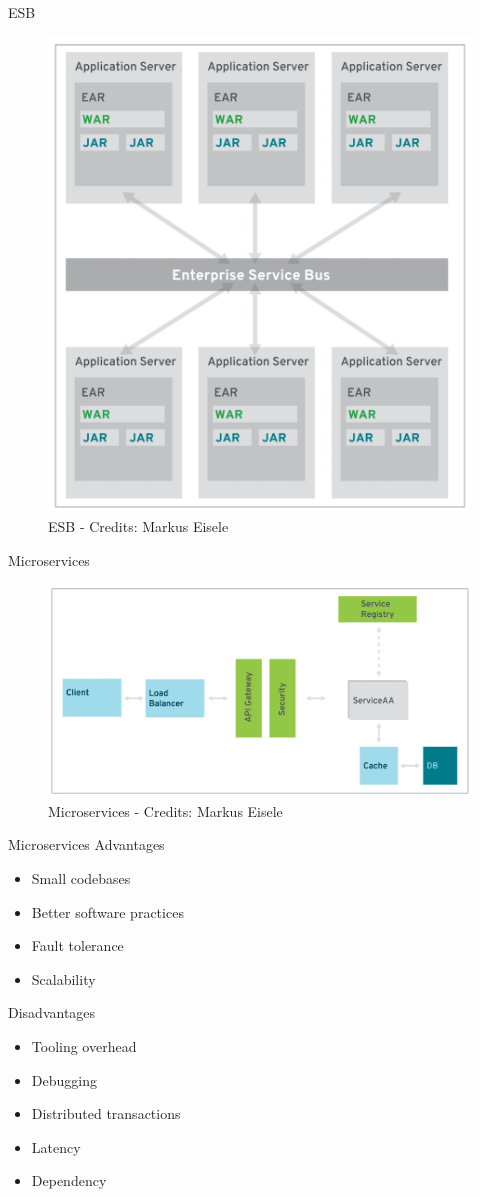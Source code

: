 \documentclass{beamer}
\begin{document}
\begin{frame}{ESB}
\begin{figure}
\centering
\includegraphics[width=0.5\linewidth]{Images/esb}
\caption{ESB - Credits: Markus Eisele}
\end{figure}
\end{frame}

\begin{frame}{Microservices}
\begin{figure}
\centering
\includegraphics[width=\linewidth]{Images/microservicios}
\caption{Microservices - Credits: Markus Eisele}
\end{figure}
\end{frame}

\begin{frame}{Microservices}
Advantages
\begin{itemize}
	\item Small codebases
	\item Better software practices
	\item Fault tolerance
	\item Scalability
\end{itemize}
Disadvantages
\begin{itemize}
	\item Tooling overhead
	\item Debugging
	\item Distributed transactions
	\item Latency
	\item Dependency
\end{itemize}
\end{frame}
\end{document}
